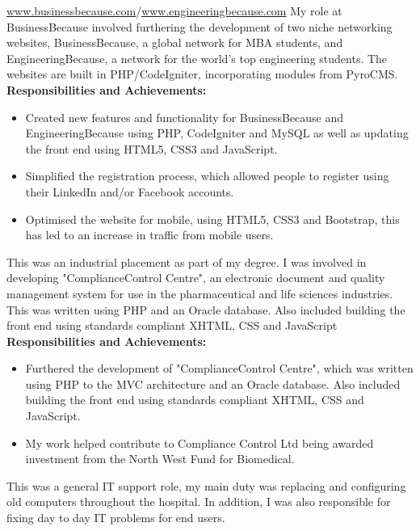 \documentclass[11pt,a4paper,sans]{moderncv}
\begin{document}
\newpage

{\href{www.businessbecause.com}{www.businessbecause.com}/\href{www.engineeringbecause.com}{www.engineeringbecause.com} \newline{}%
My role at BusinessBecause involved furthering the development of two niche networking websites, BusinessBecause, a global network for MBA students, and EngineeringBecause, a network for the world's top engineering students. The websites are built in PHP/CodeIgniter, incorporating modules from PyroCMS.} 
\textbf{Responsibilities and Achievements:}%
\begin{itemize}%
\item Created new features and functionality for BusinessBecause and EngineeringBecause using PHP, CodeIgniter and MySQL as well as updating the front end using HTML5, CSS3 and JavaScript. 
\item Simplified the registration process, which allowed people to register using their LinkedIn and/or Facebook accounts.
\item Optimised the website for mobile, using HTML5, CSS3 and Bootstrap, this has led to an increase in traffic from mobile users.\\
\end{itemize}

{This was an industrial placement as part of my degree. I was involved in developing "ComplianceControl Centre", an electronic document and quality management system for use in the pharmaceutical and life sciences industries. This was written using PHP and an Oracle database. Also included building the front end using standards compliant XHTML, CSS and JavaScript}
\textbf{Responsibilities and Achievements:}%
\begin{itemize}%
\item Furthered the development of "ComplianceControl Centre", which was written using PHP to the MVC architecture and an Oracle database. Also included building the front end using standards compliant XHTML, CSS and JavaScript.
\item My work helped contribute to Compliance Control Ltd being awarded investment from the North West Fund for Biomedical.\\
\end{itemize} 

{This was a general IT support role, my main duty was replacing and configuring old computers throughout the hospital. In addition, I was also responsible for fixing day to day IT problems for end users.}
\end{document}
